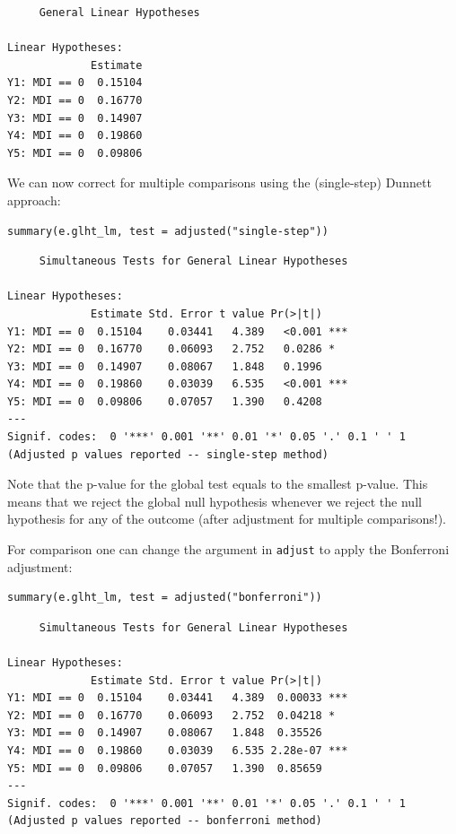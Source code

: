 \documentclass{article}
\begin{document}
\begin{verbatim}
	 General Linear Hypotheses

Linear Hypotheses:
             Estimate
Y1: MDI == 0  0.15104
Y2: MDI == 0  0.16770
Y3: MDI == 0  0.14907
Y4: MDI == 0  0.19860
Y5: MDI == 0  0.09806
\end{verbatim}

We can now correct for multiple comparisons using the (single-step)
Dunnett approach:
\lstset{language=r,label= ,caption= ,captionpos=b,numbers=none}
\begin{lstlisting}
summary(e.glht_lm, test = adjusted("single-step"))
\end{lstlisting}

\begin{verbatim}
	 Simultaneous Tests for General Linear Hypotheses

Linear Hypotheses:
             Estimate Std. Error t value Pr(>|t|)    
Y1: MDI == 0  0.15104    0.03441   4.389   <0.001 ***
Y2: MDI == 0  0.16770    0.06093   2.752   0.0286 *  
Y3: MDI == 0  0.14907    0.08067   1.848   0.1996    
Y4: MDI == 0  0.19860    0.03039   6.535   <0.001 ***
Y5: MDI == 0  0.09806    0.07057   1.390   0.4208    
---
Signif. codes:  0 '***' 0.001 '**' 0.01 '*' 0.05 '.' 0.1 ' ' 1
(Adjusted p values reported -- single-step method)
\end{verbatim}

Note that the p-value for the global test equals to the smallest
 p-value. This means that we reject the global null hypothesis
 whenever we reject the null hypothesis for any of the outcome (after
 adjustment for multiple comparisons!).


For comparison one can change the argument in \texttt{adjust} to apply the
Bonferroni adjustment:
\lstset{language=r,label= ,caption= ,captionpos=b,numbers=none}
\begin{lstlisting}
summary(e.glht_lm, test = adjusted("bonferroni"))
\end{lstlisting}

\begin{verbatim}
	 Simultaneous Tests for General Linear Hypotheses

Linear Hypotheses:
             Estimate Std. Error t value Pr(>|t|)    
Y1: MDI == 0  0.15104    0.03441   4.389  0.00033 ***
Y2: MDI == 0  0.16770    0.06093   2.752  0.04218 *  
Y3: MDI == 0  0.14907    0.08067   1.848  0.35526    
Y4: MDI == 0  0.19860    0.03039   6.535 2.28e-07 ***
Y5: MDI == 0  0.09806    0.07057   1.390  0.85659    
---
Signif. codes:  0 '***' 0.001 '**' 0.01 '*' 0.05 '.' 0.1 ' ' 1
(Adjusted p values reported -- bonferroni method)
\end{verbatim}
\end{document}
